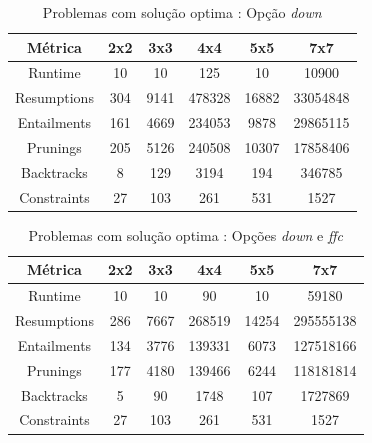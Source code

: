 \documentclass{llncs}
\begin{document}
\setlength{\tabcolsep}{12pt}
\begin{table}[ht] 
\caption{Problemas com solu\c{c}\~{a}o optima : Op\c{c}\~{a}o \emph{down}} %
\centering %
\begin{tabular}{c c c c c c} %
\hline\hline %

M\'{e}trica & 2x2 & 3x3 & 4x4 & 5x5 & 7x7\\ [0.5ex] %
\hline %
Runtime & 10 & 10 & 125 & 10 & 10900 \\
Resumptions & 304 & 9141 & 478328 & 16882 & 33054848 \\
Entailments & 161 & 4669 & 234053 & 9878 & 29865115 \\
Prunings & 205 & 5126 & 240508 & 10307 & 17858406 \\
Backtracks & 8 & 129 & 3194 & 194 & 346785 \\
Constraints & 27 & 103 & 261 & 531 & 1527 \\[1 ex]
\hline %
\end{tabular} 
\label{tabela:2} %
\end{table}

\setlength{\tabcolsep}{12pt}
\begin{table}[ht] 
\caption{Problemas com solu\c{c}\~{a}o optima : Op\c{c}\~{o}es \emph{down} e \emph{ffc}} %
\centering %
\begin{tabular}{c c c c c c} %
\hline\hline %

M\'{e}trica & 2x2 & 3x3 & 4x4 & 5x5 & 7x7\\ [0.5ex] %
\hline %
Runtime & 10 & 10 & 90 & 10 & 59180 \\
Resumptions & 286 & 7667 & 268519 & 14254 & 295555138 \\
Entailments & 134 & 3776 & 139331 & 6073 & 127518166 \\
Prunings & 177 & 4180 & 139466 & 6244 & 118181814 \\
Backtracks & 5 & 90 & 1748 & 107 & 1727869 \\
Constraints & 27 & 103 & 261 & 531 & 1527 \\[1 ex]
\hline %
\end{tabular} 
\label{tabela:3} %
\end{table}
\end{document}
